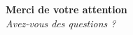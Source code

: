 \begin{frame}[plain]
    \vspace{0.6cm}
    \centering
    \textbf{\huge Merci de votre attention} \\
    \vspace{0.3cm}
    \textit{Avez-vous des questions ?}
\end{frame}